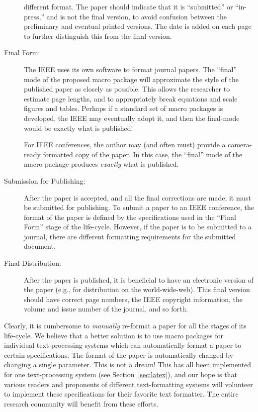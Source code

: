 \documentclass[%
	final,
	notitlepage,
	narroweqnarray,
	inline,
	twoside,
	]{ieee}
\begin{document}
\begin{description}
    different format. The paper should indicate that it is
    ``submitted'' or ``in-press,'' and is not the final version, to 
    avoid confusion between the preliminary and eventual printed
    versions. The date is added on each page to further distinguish this
    from the final version.
\item[Final Form:] The IEEE uses its own software to format journal
    papers. The ``final'' mode of the proposed macro package will
    approximate the style of the published paper as closely as possible.
    This allows the researcher to estimate page lengths, and to 
    appropriately break equations and scale figures and tables. Perhaps 
    if a standard set of macro packages is developed, the IEEE may 
    eventually adopt it, and then the final-mode would be exactly 
    what is published!

    For IEEE conferences, the author may (and often must) provide a
    camera-ready formatted copy of the paper. In this case, the 
    ``final'' mode of the macro package produces \emph{exactly} what 
    is published.
\item[Submission for Publishing:] After the paper is accepted,
    and all the final corrections are made, it must be submitted for 
    publishing. To submit a paper to an IEEE conference, the format of 
    the paper is defined by the specifications used in the ``Final Form'' 
    stage of the life-cycle. However, if the paper is to be submitted
    to a journal, there are different formatting requirements for the
    submitted document.
\item[Final Distribution:] After the paper is published, it is
    beneficial to have an electronic version of the paper
    (e.g., for distribution on the world-wide-web). This final
    version should have correct page numbers, the IEEE copyright 
    information, the volume and issue number of the journal, and so forth.
\end{description}

Clearly, it is cumbersome to \emph{manually} re-format a paper for all
the stages of its life-cycle. We believe that a better solution is to
use macro packages for individual text-processing systems which can
automatically format a paper to certain specifications.  The format of
the paper is automatically changed by changing a single parameter.
This is not a dream! This has all been implemented for one
text-processing system (see Section~\ref{sec:latex}), and our hope is
that various readers and proponents of different text-formatting
systems will volunteer to implement these specifications for their
favorite text formatter. The entire research community will benefit
from these efforts.
\end{document}
